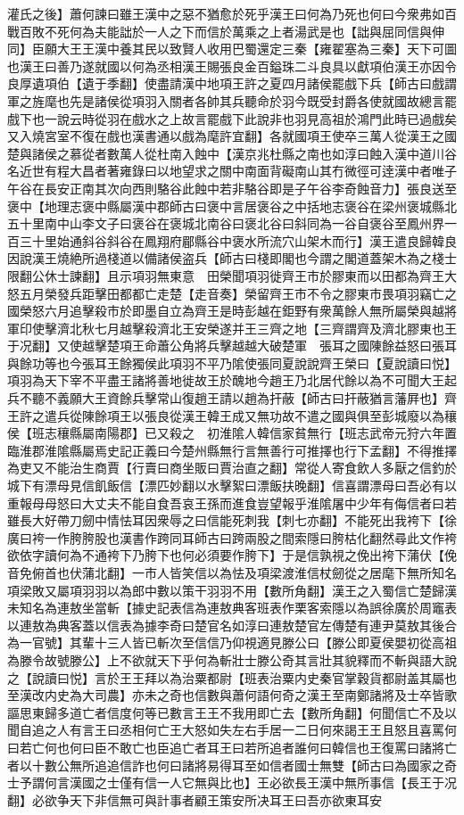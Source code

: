 灌氏之後】蕭何諫曰雖王漢中之惡不猶愈於死乎漢王曰何為乃死也何曰今衆弗如百戰百敗不死何為夫能詘於一人之下而信於萬乘之上者湯武是也【詘與屈同信與伸同】臣願大王王漢中養其民以致賢人收用巴蜀還定三秦【雍翟塞為三秦】天下可圖也漢王曰善乃遂就國以何為丞相漢王賜張良金百鎰珠二斗良具以獻項伯漢王亦因令良厚遺項伯【遺于季翻】使盡請漢中地項王許之夏四月諸侯罷戲下兵【師古曰戲謂軍之旌麾也先是諸侯從項羽入關者各帥其兵聽命於羽今既受封爵各使就國故總言罷戲下也一說云時從羽在戲水之上故言罷戲下此說非也羽見高祖於鴻門此時已過戲矣又入燒宮室不復在戲也漢書通以戲為麾許宜翻】各就國項王使卒三萬人從漢王之國楚與諸侯之慕從者數萬人從杜南入蝕中【漢京兆杜縣之南也如淳曰蝕入漢中道川谷名近世有程大昌者著雍錄曰以地望求之關中南面背礙南山其冇微徑可逹漢中者唯子午谷在長安正南其次向西則駱谷此蝕中若非駱谷即是子午谷李奇蝕音力】張良送至褒中【地理志褒中縣屬漢中郡師古曰褒中言居褒谷之中括地志褒谷在梁州褒城縣北五十里南中山李文子曰褒谷在褒城北南谷曰褒北谷曰斜同為一谷自褒谷至鳳州界一百三十里始通斜谷斜谷在鳳翔府郿縣谷中褒水所流穴山架木而行】漢王遣良歸韓良因說漢王燒絶所過棧道以備諸侯盗兵【師古曰棧即閣也今謂之閣道蓋架木為之棧士限翻公休士諫翻】且示項羽無東意　田榮聞項羽徙齊王市於膠東而以田都為齊王大怒五月榮發兵距擊田都都亡走楚【走音奏】榮留齊王市不令之膠東市畏項羽竊亡之國榮怒六月追擊殺市於即墨自立為齊王是時彭越在鉅野有衆萬餘人無所屬榮與越將軍印使擊濟北秋七月越擊殺濟北王安榮遂并王三齊之地【三齊謂齊及濟北膠東也王于况翻】又使越擊楚項王命蕭公角將兵擊越越大破楚軍　張耳之國陳餘益怒曰張耳與餘功等也今張耳王餘獨侯此項羽不平乃隂使張同夏說說齊王榮曰【夏說讀曰悦】項羽為天下宰不平盡王諸將善地徙故王於醜地今趙王乃北居代餘以為不可聞大王起兵不聽不義願大王資餘兵擊常山復趙王請以趙為扞蔽【師古曰扞蔽猶言藩屛也】齊王許之遣兵從陳餘項王以張良從漢王韓王成又無功故不遣之國與俱至彭城廢以為穰侯【班志穰縣屬南陽郡】已又殺之　初淮隂人韓信家貧無行【班志武帝元狩六年置臨淮郡淮隂縣屬焉史記正義曰今楚州縣無行言無善行可推擇也行下孟翻】不得推擇為吏又不能治生商賈【行賣曰商坐販曰賈治直之翻】常從人寄食飲人多厭之信釣於城下有漂母見信飢飯信【漂匹妙翻以水擊絮曰漂飯扶晚翻】信喜謂漂母曰吾必有以重報母母怒曰大丈夫不能自食吾哀王孫而進食豈望報乎淮隂屠中少年有侮信者曰若雖長大好帶刀劒中情怯耳因衆辱之曰信能死刺我【刺七亦翻】不能死出我袴下【徐廣曰袴一作胯胯股也漢書作跨同耳師古曰跨兩股之間索隱曰胯枯化翻然尋此文作袴欲依字讀何為不通袴下乃胯下也何必須要作胯下】于是信孰視之俛出袴下蒲伏【俛音免俯首也伏蒲北翻】一市人皆笑信以為怯及項梁渡淮信杖劒從之居麾下無所知名項梁敗又屬項羽羽以為郎中數以策干羽羽不用【數所角翻】漢王之入蜀信亡楚歸漢未知名為連敖坐當斬【據史記表信為連敖典客班表作栗客索隱以為誤徐廣於周竈表以連敖為典客蓋以信表為據李奇曰楚官名如淳曰連敖楚官左傳楚有連尹莫敖其後合為一官號】其輩十三人皆已斬次至信信乃仰視適見滕公曰【滕公即夏侯嬰初從高祖為滕令故號滕公】上不欲就天下乎何為斬壯士滕公奇其言壯其貌釋而不斬與語大說之【說讀曰悦】言於王王拜以為治粟都尉【班表治粟内史秦官掌穀貨都尉盖其屬也至漢改内史為大司農】亦未之奇也信數與蕭何語何奇之漢王至南鄭諸將及士卒皆歌謳思東歸多道亡者信度何等已數言王王不我用即亡去【數所角翻】何聞信亡不及以聞自追之人有言王曰丞相何亡王大怒如失左右手居一二日何來謁王王且怒且喜罵何曰若亡何也何曰臣不敢亡也臣追亡者耳王曰若所追者誰何曰韓信也王復罵曰諸將亡者以十數公無所追追信詐也何曰諸將易得耳至如信者國士無雙【師古曰為國家之奇士予謂何言漢國之士僅有信一人它無與比也】王必欲長王漢中無所事信【長王于况翻】必欲争天下非信無可與計事者顧王策安所决耳王曰吾亦欲東耳安